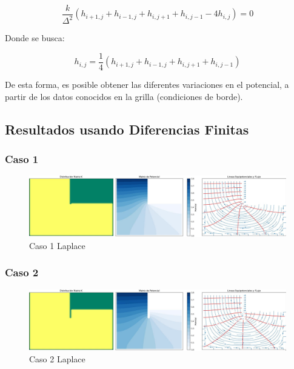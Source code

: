 \begin{equation}
    \frac{k}{\Delta^2}(h_{i+1,j} + h_{i-1,j} + h_{i,j+1} + h_{i,j-1} - 4h_{i,j}) = 0
\end{equation}

Donde se busca:

\begin{equation}
    h_{i,j} = \frac{1}{4}(h_{i+1,j} + h_{i-1,j} + h_{i,j+1} + h_{i,j-1})
\end{equation}

De esta forma, es posible obtener las diferentes variaciones en el potencial, a partir de los datos conocidos en la grilla (condiciones de borde).

\subsection{Resultados usando Diferencias Finitas}

\subsubsection{Caso 1}

\begin{figure}[H]
    \centering
    \includegraphics[width=\textwidth]{GRAFICOS/laplace_caso_1.jpg}
    \caption{Caso 1 Laplace}
\end{figure}

\subsubsection{Caso 2}

\begin{figure}[H]
    \centering
    \includegraphics[width=\textwidth]{GRAFICOS/laplace_caso_2.jpg}
    \caption{Caso 2 Laplace}
\end{figure}

